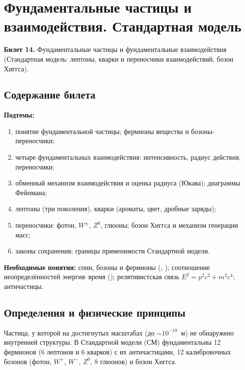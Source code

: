 \chapter[Фундаментальные частицы и взаимодействия. Стандартная модель]%
        {Фундаментальные частицы и взаимодействия. Стандартная модель}
\label{t:14}

\begin{qbox}
\textbf{Билет 14.} Фундаментальные частицы и фундаментальные взаимодействия (Стандартная модель:
лептоны, кварки и переносчики взаимодействий, бозон Хиггса).
\end{qbox}

\section{Содержание билета}

\textbf{Подтемы:}
\begin{enumerate}
 \item понятие фундаментальной частицы; фермионы вещества и бозоны-переносчики;
 \item четыре фундаментальных взаимодействия: интенсивность, радиус действия, переносчики;
 \item обменный механизм взаимодействия и оценка радиуса (Юкава); диаграммы Фейнмана;
 \item лептоны (три поколения), кварки (ароматы, цвет, дробные заряды);
 \item переносчики: фотон, $W^\pm$, $Z^0$, глюоны; бозон Хиггса и механизм генерации масс;
 \item законы сохранения; границы применимости Стандартной модели.
\end{enumerate}

\textbf{Необходимые понятия:} спин, бозоны и фермионы (, ); соотношение
неопределённостей энергия--время (); релятивистская связь $E^2=p^2c^2+m^2c^4$; античастицы.

\section{Определения и физические принципы}

\begin{definition}
Частица, у которой на достигнутых масштабах (до $\sim10^{-19}$~м) не обнаружено внутренней структуры.
В Стандартной модели (СМ) фундаментальны 12 фермионов (6 лептонов и 6 кварков) с их античастицами,
12 калибровочных бозонов (фотон, $W^+$, $W^-$, $Z^0$, 8 глюонов) и бозон Хиггса.
\end{definition}


